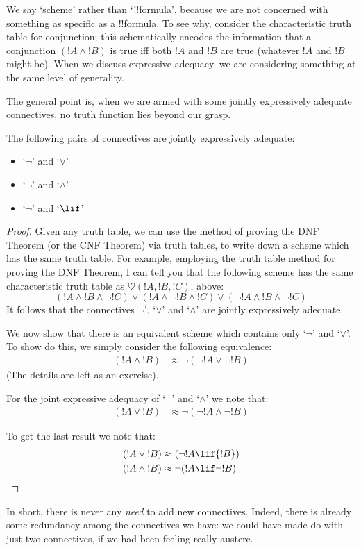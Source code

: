 \documentclass[../../../include/open-logic-section]{subfiles}
\begin{document}
We say `scheme' rather than `!!{formula}', because we are not concerned with something as specific as a !!{formula}. To see why, consider the characteristic truth table for conjunction; this schematically encodes the information that a conjunction $({!A} \land {!B})$ is true iff both ${!A}$ and ${!B}$ are true (whatever ${!A}$ and ${!B}$ might be). When we discuss expressive adequacy, we are considering something at the same level of generality. 

The general point is, when we are armed with some jointly expressively adequate connectives, no truth function lies beyond our grasp. 
	\begin{thm}
		The following pairs of connectives are jointly expressively adequate:
			\begin{itemize}
				\item `$\lnot$' and `$\lor$'
				\item `$\lnot$' and `$\land$'
				\item `$\lnot$' and `$\lif$'
			\end{itemize}
			\begin{proof}
				Given any truth table, we can use the method of proving the DNF Theorem (or the CNF Theorem) via truth tables, to write down a scheme which has the same truth table. For example, employing the truth table method for proving the DNF Theorem, I can tell you that the following scheme has the same characteristic truth table as $\heartsuit({!A},{!B},{!C})$, above:
		$$({!A} \land {!B} \land \lnot {!C}) \lor ({!A} \land \lnot{!B} \land {!C}) \lor (\lnot {!A} \land {!B} \land \lnot {!C})$$			
			It follows that the connectives $\lnot$', `$\lor$' and `$\land$' are jointly expressively adequate. 

			We now show that there is an equivalent scheme which contains only `$\lnot$' and `$\lor$'. To show do this, we simply consider the following equivalence:
		\begin{align*}
		({!A} \land {!B}) &\approx \lnot(\lnot {!A} \lor\lnot {!B})
		\end{align*}
		(The details are left as an exercise).

		For the joint expressive adequacy of `$\lnot$' and `$\land$' we note that:
		\begin{align*}
		({!A} \lor {!B}) &\approx \lnot(\lnot {!A} \land\lnot {!B})
		\end{align*}

		To get the last result we note that:
		\begin{align*}
		({!A} \lor {!B}) &\approx (\lnot {!A} \lif{!B})\\
		({!A} \land {!B}) &\approx \lnot({!A} \lif \lnot{!B})
		\end{align*}
			\end{proof}
	\end{thm}\noindent
In short, there is never any \emph{need} to add new connectives. Indeed, there is already some redundancy among the connectives we have: we could have made do with just two connectives, if we had been feeling really austere.
\end{document}
